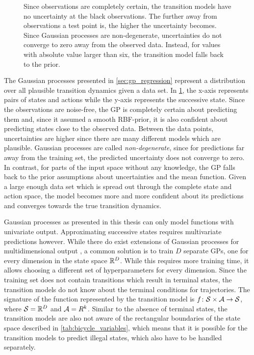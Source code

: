 \begin{figure}[tb]
    \centering
    \caption[GP transition models]{
        Since observations are completely certain, the transition models have no uncertainty at the black observations.
        The further away from observations a test point is, the higher the uncertainty becomes.
        Since Gaussian processes are non-degenerate, uncertainties do not converge to zero away from the observed data.
        Instead, for values with absolute value larger than six, the transition model falls back to the prior.
    }
    \label{fig:gp_transition_models}
\end{figure}
The Gaussian processes presented in \cref{sec:gp_regression} represent a distribution over all plausible transition dynamics given a data set.
In \cref{fig:gp_transition_models}, the x-axis represents pairs of states and actions while the y-axis represents the successive state.
Since the observations are noise-free, the GP is completely certain about predicting them and, since it assumed a smooth RBF-prior, it is also confident about predicting states close to the observed data.
Between the data points, uncertainties are higher since there are many different models which are plausible.
Gaussian processes are called \emph{non-degenerate}, since for predictions far away from the training set, the predicted uncertainty does not converge to zero.
In contrast, for parts of the input space without any knowledge, the GP falls back to the prior assumptions about uncertainties and the mean function.
Given a large enough data set which is spread out through the complete state and action space, the model becomes more and more confident about its predictions and converges towards the true transition dynamics.

Gaussian processes as presented in this thesis can only model functions with univariate output.
Approximating successive states requires multivariate predictions however.
While there do exist extensions of Gaussian processes for multidimensional output \cite{rasmussen_gaussian_2006}, a common solution is to train $D$ separate GPs, one for every dimension in the state space $\mathbb{R}^D$.
While this requires more training time, it allows choosing a different set of hyperparameters for every dimension.
Since the training set does not contain transitions which result in terminal states, the transition models do not know about the terminal conditions for trajectories.
The signature of the function represented by the transition model is $f \colon \mathcal{S} \times \mathcal{A} \to \mathcal{S}$, where $\mathcal{S} = \mathbb{R}^D$ and $\mathcal{A} = R^k$.
Similar to the absence of terminal states, the transition models are also not aware of the rectangular boundaries of the state space described in \cref{tab:bicycle_variables}, which means that it is possible for the transition models to predict illegal states, which also have to be handled separately.

